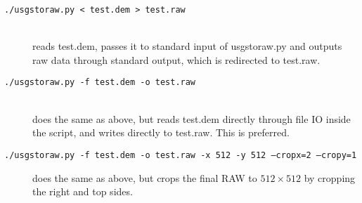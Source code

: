 \begin{description}
\item[\texttt{./usgstoraw.py < test.dem > test.raw}] \hfill\\
reads test.dem, passes it to standard input of usgstoraw.py and outputs raw data through standard output, which is redirected to test.raw.

\item[\texttt{./usgstoraw.py -f test.dem -o test.raw}] \hfill\\
does the same as above, but reads test.dem directly through file IO inside the script, and writes directly to test.raw. This is preferred.

\item[\texttt{./usgstoraw.py -f test.dem -o test.raw -x 512 -y 512 --cropx=2 --cropy=1}]
does the same as above, but crops the final RAW to $512\times 512$ by cropping the right and top sides.

\end{description}

